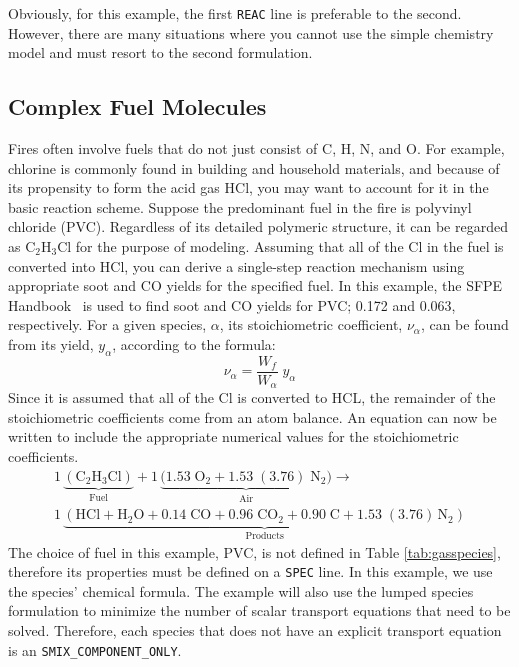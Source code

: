 \documentclass[11pt]{book}
\newcommand{\ct}{\tt\small}
\begin{document}
Obviously, for this example, the first {\ct REAC} line is preferable to the second. However, there are many situations where you cannot use the simple chemistry model and must resort to the second formulation.


\subsection{Complex Fuel Molecules}

\label{info:Complex_Fuel}

Fires often involve fuels that do not just consist of C, H, N, and O. For example, chlorine is commonly found in building and household materials, and because
of its propensity to form the acid gas HCl, you may want to account for it in the basic reaction scheme. Suppose the predominant fuel in the fire is polyvinyl chloride (PVC). Regardless of its detailed polymeric structure, it can be regarded as C$_2$H$_3$Cl for the purpose of modeling. Assuming that all of the Cl in the fuel is converted into HCl, you can derive a single-step reaction mechanism using appropriate soot and CO yields for the specified fuel. In this example, the SFPE Handbook~\cite{SFPE:Tewarson} is used to find soot and CO yields for PVC; 0.172 and 0.063, respectively. For a given species, $\alpha$, its stoichiometric coefficient, $\nu_\alpha$, can be found from its yield, $y_\alpha$, according to the formula:
\begin{equation}\label{eq:stoic_yield}
\nu_\alpha = \frac{W_{f}}{W_\alpha} \; y_\alpha
\end{equation}
Since it is assumed that all of the Cl is converted to HCL, the remainder of the stoichiometric coefficients come from an atom balance. An equation can now be written to include the appropriate numerical values for the stoichiometric coefficients.
\begin{eqnarray}\label{eq:PVC_reac2}
1\,\underbrace{\mathrm{(C_2H_3Cl)}}_\text{Fuel} + 1\,\underbrace{\mathrm{(1.53 \; O_2 + 1.53 \;(3.76) \; N_2})}_\text{Air} \rightarrow \\
\nonumber 1\,\underbrace{\mathrm{(HCl +  H_2O + 0.14 \; CO + 0.96 \; CO_2 + 0.90\; C + 1.53\; (3.76) \, N_2)}}_\text{Products}
\end{eqnarray}
The choice of fuel in this example, PVC, is not defined in Table \ref{tab:gasspecies}, therefore its properties must be defined on a {\ct SPEC} line. In this example, we use the species' chemical formula. The example will also use the lumped species formulation to minimize the number of scalar transport equations that need to be solved. Therefore, each species that does not have an explicit transport equation is an {\ct SMIX\_COMPONENT\_ONLY}.
\end{document}
